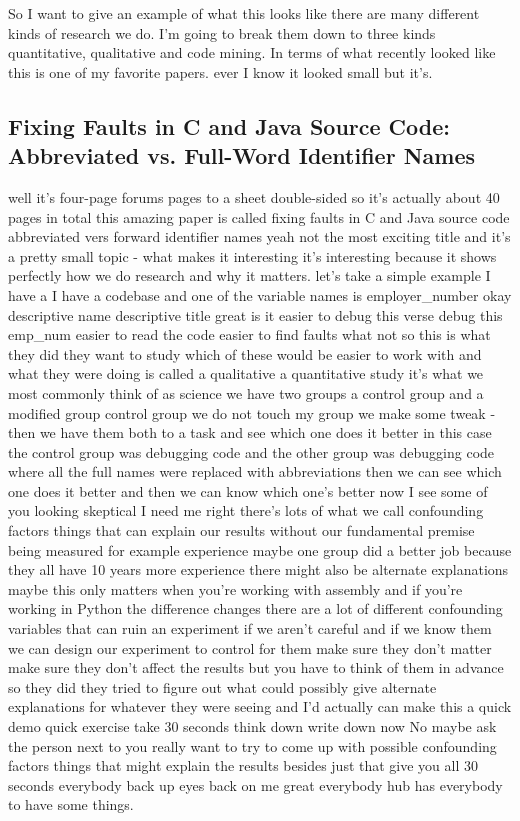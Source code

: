 \documentclass[conference, compsoc, twoside]{IEEEtran}
\begin{document}
So I want to give an example of what this looks like there are many different kinds of research we do.
I'm going to break them down to three kinds quantitative, qualitative and code mining.
In terms of what recently looked like this is one of my favorite papers.
ever I know it looked small but it's.
\subsection{Fixing Faults in C and Java Source Code: Abbreviated vs. Full-Word Identifier Names}
well it's four-page forums pages to a sheet double-sided so it's actually about 40 pages in total this amazing paper is called fixing faults in C and Java source code
abbreviated vers forward identifier
names yeah not the most exciting title
and it's a pretty small topic - what
makes it interesting it's interesting
because it shows perfectly how we do
research and why it matters.
let's take a simple example I have a I
have a codebase and one of the variable
names is employer\_number okay
descriptive name descriptive title great
is it easier to debug this verse debug
this emp\_num easier to read the code
easier to find faults what not so this
is what they did they want to study
which of these would be easier to work
with and what they were doing is called a qualitative a quantitative study it's
what we most commonly think of as science we have two groups a control
group and a modified group control group
we do not touch my group we make some
tweak - then we have them both to a task
and see which one does it better in this
case the control group was debugging
code and the other group was debugging
code where all the full names were
replaced with abbreviations then we can
see which one does it better and then we
can know which one's better now I see
some of you looking skeptical I need me
right there's lots of what we call
confounding factors things that can
explain our results without our
fundamental premise being measured for
example experience maybe one group did a
better job because they all have 10
years more experience there might also
be alternate explanations
maybe this only matters when you're
working with assembly and if you're
working in Python the difference changes
there are a lot of different confounding
variables that can ruin an experiment if
we aren't careful and if we know them we
can design our experiment to control for
them make sure they don't matter
make sure they don't affect the results
but you have to think of them in advance
so they did they tried to figure out
what could possibly give alternate
explanations for whatever they were
seeing and I'd actually can make this a
quick demo quick exercise take 30
seconds think down write down now No
maybe ask the person next to you really
want to try to come up with possible
confounding factors things that might
explain the results besides just that
give you all 30 seconds
everybody back up eyes back on me great
everybody hub has everybody to have some
things.
\end{document}
